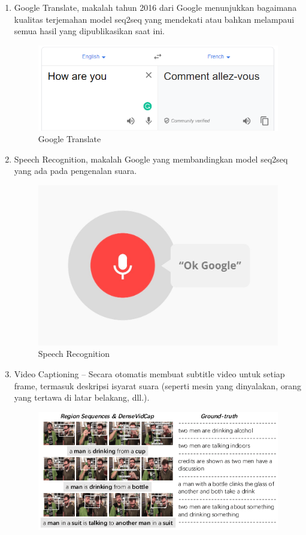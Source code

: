 \begin{enumerate}
\item Google Translate, makalah tahun 2016 dari Google menunjukkan bagaimana kualitas terjemahan model seq2seq yang mendekati atau bahkan melampaui semua hasil yang dipublikasikan saat ini.
\begin{figure}[H]
        \centerline{\includegraphics[scale=.5]{figures/terjemahan}}
        \caption{Google Translate}
		\label{terjemahan}
\end{figure}
\item Speech Recognition, makalah Google yang membandingkan model seq2seq yang ada pada pengenalan suara.
\begin{figure}[H]
        \centerline{\includegraphics[scale=.25]{figures/voice}}
        \caption{Speech Recognition}
		\label{voice}
\end{figure}
\item Video Captioning –  Secara otomatis membuat subtitle video untuk setiap frame, termasuk deskripsi isyarat suara (seperti mesin yang dinyalakan, orang yang tertawa di latar belakang, dll.).
\begin{figure}[H]
        \centerline{\includegraphics[scale=.45]{figures/video-captioning}}

\end{figure}
\end{enumerate}
